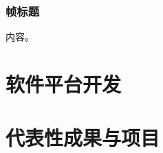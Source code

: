 \documentclass[notheorems]{beamer}
\begin{document}
	\begin{frame}
		\frametitle{帧标题}
		内容。
	\end{frame}
	
	\begin{frame}
	\end{frame}
	
	
	\section{软件平台开发}
	
	
	\section{代表性成果与项目}
	
\end{document}
